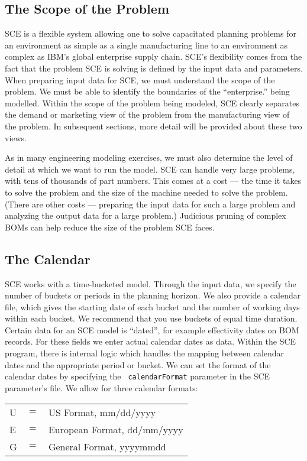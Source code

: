 \subsection{The Scope of the Problem}
SCE is a flexible system allowing one to solve capacitated planning
problems for an environment as simple as a single manufacturing line to an
environment as complex as IBM's global enterprise supply chain.  SCE's
flexibility comes from the fact that the problem SCE is solving is
defined by the input data and parameters.  When preparing input data
for SCE, we must understand the scope of the problem.  We must be able
to identify the boundaries of the ``enterprise.'' being modelled.
Within the scope of the problem being modeled, SCE clearly separates
the demand or marketing view of the problem from the manufacturing
view of the problem.  In subsequent sections, more detail will be
provided about these two views.

As in many engineering modeling exercises, we must also determine the
level of detail at which we want to run the model.  SCE can handle
very large problems, with tens of thousands of part numbers.  This
comes at a cost --- the time it takes to solve the problem and the
size of the machine needed to solve the problem.  (There are other
costs --- preparing the input data for such a large problem and
analyzing the output data for a large problem.)  Judicious pruning of
complex BOMs can help reduce the size of the problem SCE faces.

\subsection{The Calendar}
SCE works with a time-bucketed model.  Through the input data, we
specify the number of buckets or periods in the planning horizon.  We
also provide a calendar file, which gives the starting date of each
bucket and the number of working days within each bucket.  We
recommend that you use buckets of equal time duration.  Certain data
for an SCE model is ``dated'', for example effectivity dates on BOM
records.  For these fields we enter actual calendar dates as data.
Within the SCE program, there is internal logic which handles the
mapping between calendar dates and the appropriate period or bucket.
We can set the format of the calendar dates by specifying the {\tt
calendarFormat} parameter in the SCE parameter's file.  We allow for
three calendar formats:

         \begin{tabular}[t]{lcl}
                              U& $=$& US Format, mm/dd/yyyy \\
                              E& $=$& European Format, dd/mm/yyyy \\
                              G& $=$& General Format, yyyymmdd 
         \end{tabular} \\


